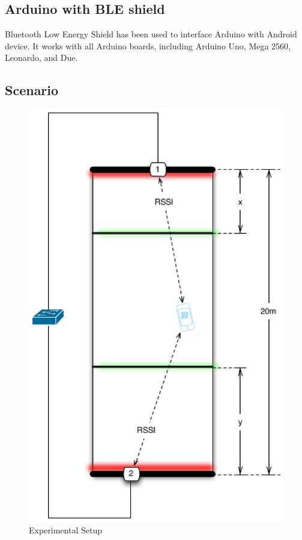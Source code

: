 \documentclass[conference,a4paper]{../../sty/IEEEtran}
\begin{document}
\subsection{Arduino with BLE shield}

Bluetooth Low Energy Shield has been used to interface Arduino with Android device. It works with all Arduino boards, including Arduino Uno, Mega 2560, Leonardo, and Due. 

\subsection{Scenario}

\begin{figure}[h!]
\centering
\includegraphics[scale=0.5]{position.eps}
\caption{Experimental Setup}
\label{fig1}
\end{figure}
\end{document}
